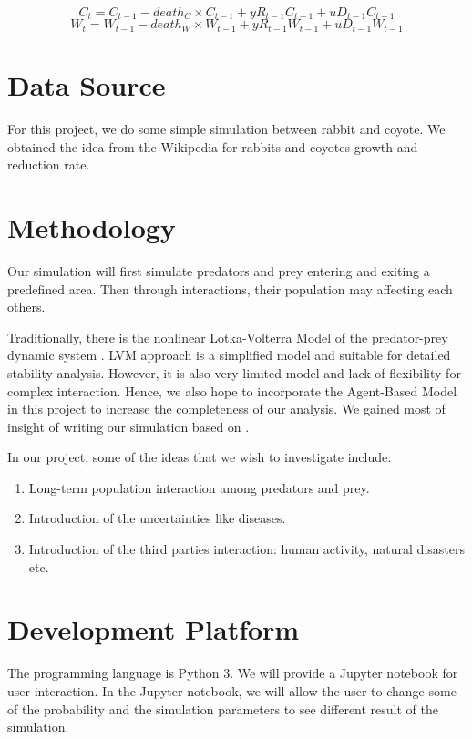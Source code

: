 \documentclass{article}
\begin{document}
\begin{normalsize}
		
		
		\begin{equation}
		    C_{t} = C_{t-1} - death_C \times C_{t-1} + yR_{t-1}C_{t-1} + u D_{t-1}C_{t-1}
		\end{equation}
		\begin{equation}
		    W_{t} = W_{t-1} - death_W \times W_{t-1} + yR_{t-1}W_{t-1} + u D_{t-1}W_{t-1}
		\end{equation}
		\section{Data Source}
		For this project, we do some simple simulation between rabbit and coyote. We obtained the idea from the Wikipedia for rabbits and coyotes growth and reduction rate.
	
		\section{Methodology}
		Our simulation will first simulate predators and prey entering and exiting a predefined area. Then through interactions, their population may affecting each others.
		
		Traditionally, there is the nonlinear Lotka-Volterra Model of the predator-prey dynamic system \cite{inproceedings, 1102729}. LVM approach is a simplified model and suitable for detailed stability analysis. However, it is also very limited model and lack of flexibility for complex interaction. Hence, we also hope to incorporate the Agent-Based Model \cite{Hodzic} in this project to increase the completeness of our analysis. We gained most of insight of writing our simulation based on \cite{Sayama2013}.
		
		In our project, some of the ideas that we wish to investigate include:
		\begin{enumerate}
			\item Long-term population interaction among predators and prey.
			\item Introduction of the uncertainties like diseases.
			\item Introduction of the third parties interaction: human activity, natural disasters etc.
		\end{enumerate}
		
		\section{Development Platform}
		The programming language is Python 3. We will provide a Jupyter notebook for user interaction.
		In the Jupyter notebook, we will allow the user to change some of the probability and the simulation parameters to see different result of the simulation.
		

\end{normalsize}
\end{document}
